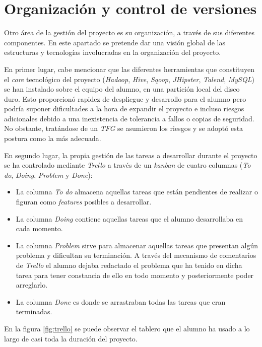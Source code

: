 \section{Organización y control de versiones} \label{gestion.organizacion}
Otro área de la gestión del proyecto es su organización, a través de sus diferentes componentes. En este apartado se pretende dar una visión global de las estructuras y tecnologías involucradas en la organización del proyecto. 
\par En primer lugar, cabe mencionar que las diferentes herramientas que constituyen el \textit{core }tecnológico del proyecto (\textit{Hadoop}, \textit{Hive}, \textit{Sqoop}, \textit{JHipster}, \textit{Talend}, \textit{MySQL}) se han instalado sobre el equipo del alumno, en una partición local del disco duro. Esto proporcionó rapidez de despliegue y desarrollo para el alumno pero podría suponer dificultades a la hora de expandir el proyecto e incluso riesgos adicionales debido a una inexistencia de tolerancia a fallos o copias de seguridad. No obstante, tratándose de un \textit{TFG} se asumieron los riesgos y se adoptó esta postura como la más adecuada. 
\par En segundo lugar, la propia gestión de las tareas a desarrollar durante el proyecto se ha controlado mediante \textit{Trello} \cite{trello} a través de un \textit{\gls{kanban}} de cuatro columnas (\textit{To do}, \textit{Doing}, \textit{Problem} y \textit{Done}): 
\begin{itemize}
\item La columna \textit{To do} almacena aquellas tareas que están pendientes de realizar o figuran como \textit{features} posibles a desarrollar.
\item La columna \textit{Doing} contiene aquellas tareas que el alumno desarrollaba en cada momento.
\item La columna \textit{Problem} sirve para almacenar aquellas tareas que presentan algún problema y dificultan su terminación. A través del mecanismo de comentarios de \textit{Trello} el alumno dejaba redactado el problema que ha tenido en dicha tarea para tener constancia de ello en todo momento y posteriormente poder arreglarlo. 
\item La columna \textit{Done} es donde se arrastraban todas las tareas que eran terminadas.
\end{itemize} 
En la figura \ref{fig:trello} se puede observar el tablero que el alumno ha usado a lo largo de casi toda la duración del proyecto.

